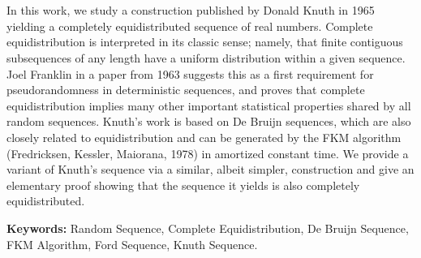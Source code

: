 \chapter*{\runtitle}

\noindent In this work, we study a construction published by Donald Knuth in 1965 yielding a completely equidistributed sequence of real numbers. Complete equidistribution is interpreted in its classic sense; namely, that finite contiguous subsequences of any length have a uniform distribution within a given sequence. Joel Franklin in a paper from 1963 suggests this as a first requirement for pseudorandomness in deterministic sequences, and proves that complete equidistribution implies many other important statistical properties shared by all random sequences. Knuth's work is based on De Bruijn sequences, which are also closely related to equidistribution and can be generated by the FKM algorithm (Fredricksen, Kessler, Maiorana, 1978) in amortized constant time. We provide a variant of Knuth's sequence via a similar, albeit simpler, construction and give an elementary proof showing that the sequence it yields is also completely equidistributed.

\bigskip

\noindent\textbf{Keywords:} Random Sequence, Complete Equidistribution, De Bruijn Sequence, FKM Algorithm, Ford Sequence, Knuth Sequence.
